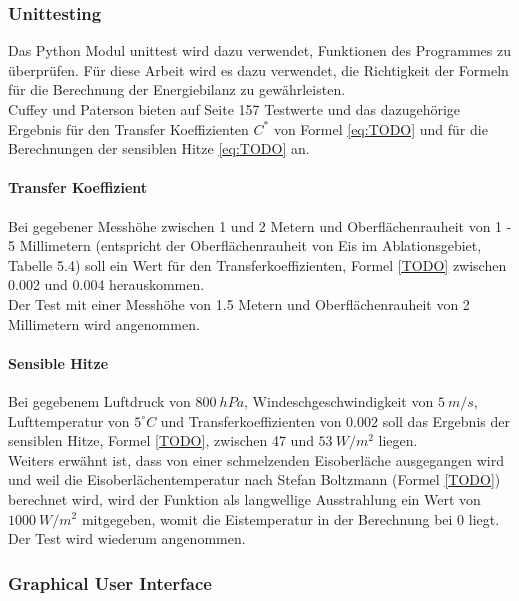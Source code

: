\documentclass[12pt,a4paper]{article}
\begin{document}
\subsubsection{Unittesting}
Das Python Modul unittest wird dazu verwendet, Funktionen des Programmes zu überprüfen. Für diese Arbeit wird es dazu verwendet, die Richtigkeit der Formeln für die Berechnung der Energiebilanz zu gewährleisten.\\

Cuffey und Paterson bieten auf Seite 157 Testwerte und das dazugehörige Ergebnis für den Transfer Koeffizienten $C^*$ von Formel \ref{eq:TODO} und für die Berechnungen der sensiblen Hitze \ref{eq:TODO} an.


\paragraph{Transfer Koeffizient}

Bei gegebener Messhöhe zwischen 1 und 2 Metern und Oberflächenrauheit von  1 - 5 Millimetern (entspricht der Oberflächenrauheit von Eis im Ablationsgebiet, Tabelle 5.4) soll ein Wert für den Transferkoeffizienten, Formel \ref{TODO} zwischen 0.002 und 0.004 herauskommen.\\

Der Test mit einer Messhöhe von 1.5 Metern und Oberflächenrauheit von 2 Millimetern wird angenommen.

\paragraph{Sensible Hitze}
Bei gegebenem Luftdruck von $800~hPa$, Windeschgeschwindigkeit von $5~m/s$, Lufttemperatur von $5^\circ C$ und Transferkoeffizienten von $0.002$ soll das Ergebnis der sensiblen Hitze, Formel \ref{TODO}, zwischen 47 und $53~W/m^2$ liegen. \\
Weiters erwähnt ist, dass von einer schmelzenden Eisoberläche ausgegangen wird und weil die Eisoberlächentemperatur nach Stefan Boltzmann (Formel \ref{TODO}) berechnet wird, wird der Funktion als langwellige Ausstrahlung ein Wert von $1000~W/m^2$ mitgegeben, womit die Eistemperatur in der Berechnung bei 0 liegt.\\

Der Test wird wiederum angenommen.

\subsubsection{Graphical User Interface}
\end{document}
